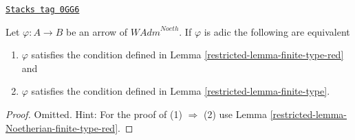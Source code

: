 \begin{lemma}
\label{restricted-lemma-Noetherian-adic-finite-type-red}
\href{https://stacks.math.columbia.edu/tag/0GG6}{\texttt{Stacks tag 0GG6}}

Let $\varphi : A \to B$ be an arrow of $\textit{WAdm}^{Noeth}$.
If $\varphi$ is adic the following are equivalent
\begin{enumerate}
\item $\varphi$ satisfies the condition defined in
Lemma \ref{restricted-lemma-finite-type-red} and
\item $\varphi$ satisfies the condition defined in
Lemma \ref{restricted-lemma-finite-type}.
\end{enumerate}
\end{lemma}

\begin{proof}

Omitted. Hint: For the proof of (1) $\Rightarrow$ (2) use
Lemma \ref{restricted-lemma-Noetherian-finite-type-red}.
\end{proof}

